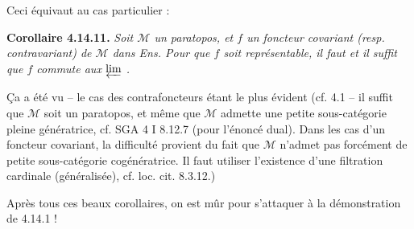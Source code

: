 
Ceci équivaut au cas particulier :

\textbf{Corollaire 4.14.11.} \textit{Soit $\mathcal{M}$ un paratopos, et $f$ un foncteur covariant (resp. contravariant) de $\mathcal{M}$ dans \textup{Ens}. Pour que $f$ soit représentable, il faut et il suffit que $f$ commute aux $\varprojlim$ .}

Ça a été vu -- le cas des contrafoncteurs étant le plus évident (cf. 4.1 -- il suffit que $\mathcal{M}$ soit un paratopos, et même que $\mathcal{M}$ admette une petite sous-catégorie pleine génératrice, cf. SGA 4 I 8.12.7 (pour l'énoncé dual). Dans les cas d'un foncteur covariant, la difficulté provient du fait que $\mathcal{M}$ n'admet pas forcément de petite sous-catégorie cogénératrice. Il faut utiliser l'existence d'une filtration cardinale (généralisée), cf. loc. cit. 8.3.12.) %

Après tous ces beaux corollaires, on est mûr pour s'attaquer à la démonstration de 4.14.1 !

